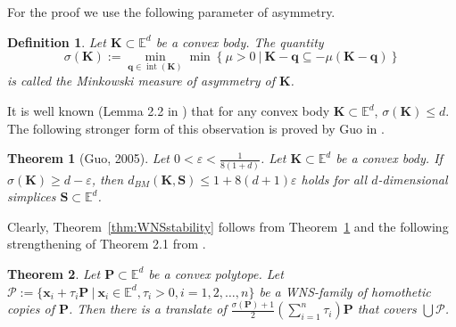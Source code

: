 \documentclass[12pt]{article}
\newtheorem{thm}{Theorem}
\newtheorem{defn}{Definition}
\DeclareMathOperator{\inter}{int}
\newcommand{\xx}{\mathbf{x}}
\newcommand{\Ee}{{\mathbb E}}
\begin{document}
For the proof we use the following parameter of asymmetry.

\begin{defn}\label{defn:Minkowski}
Let $\mathbf{K} \subset \Ee^d$ be a convex body. The quantity
\[
\sigma(\mathbf{K}) := \min_{\mathbf{q} \in \inter (\mathbf{K}) } \min \left\{ \mu > 0 \ |\  \mathbf{K}-\mathbf{q} \subseteq - \mu (\mathbf{K}-\mathbf{q}) \right\}
\]
is called the \emph{Minkowski measure of asymmetry} of $\mathbf{K}$.
\end{defn}

It is well known (Lemma 2.2 in \cite{ABG}) that for any convex body $\mathbf{K} \subset \Ee^d$, $\sigma(\mathbf{K}) \leq d$. The following stronger form of this observation is proved by Guo in \cite[Theorem A]{Guo}.

\begin{thm}[Guo, 2005]\label{thm:Guo}
Let $0 < \varepsilon < \frac{1}{8(1+d)}$. Let $\mathbf{K} \subset \Ee^d$ be a convex body. If $\sigma(\mathbf{K}) \geq d-\varepsilon$, then $d_{BM}(\mathbf{K}, \mathbf{S}) \leq 1+8(d+1) \varepsilon$ holds for all $d$-dimensional simplices $\mathbf{S}\subset \Ee^d$.
\end{thm}
Clearly, Theorem~\ref{thm:WNSstability} follows from Theorem~\ref{thm:Guo} and the following strengthening of Theorem 2.1 from \cite{ABG}.

\begin{thm}\label{strongerABG}
Let $\mathbf{P} \subset \Ee^d$ be a convex polytope. Let $\mathcal{P} := \{ \xx_i + \tau_i \mathbf{P}\ |\  \xx_i\in \Ee^d, \tau_i>0, i=1,2,\ldots, n\}$ be a WNS-family of homothetic copies of $\mathbf{P}$. Then there is a translate of $\frac{\sigma(\mathbf{P})+1}{2} \left( \sum_{i=1}^n \tau_i\right) \mathbf{P}$ that covers $\bigcup \mathcal{P}$.
\end{thm}
\end{document}
